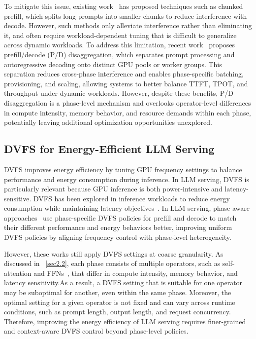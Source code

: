 To mitigate this issue, existing work~\cite{XX} has proposed techniques such as chunked prefill, which splits long prompts into smaller chunks to reduce interference with decode. However, such methods only alleviate interference rather than eliminating it, and often require workload-dependent tuning that is difficult to generalize across dynamic workloads. To address this limitation, recent work~\cite{XX} proposes prefill/decode (P/D) disaggregation, which separates prompt processing and autoregressive decoding onto distinct GPU pools or worker groups. This separation reduces cross-phase interference and enables phase-specific batching, provisioning, and scaling, allowing systems to better balance TTFT, TPOT, and throughput under dynamic workloads. However, despite these benefits, P/D disaggregation is a phase-level mechanism and overlooks operator-level differences in compute intensity, memory behavior, and resource demands within each phase, potentially leaving additional optimization opportunities unexplored.

\subsection{DVFS for Energy-Efficient LLM Serving}
DVFS improves energy efficiency by tuning GPU frequency settings to balance performance and energy consumption during inference. In LLM serving, DVFS is particularly relevant because GPU inference is both power-intensive and latency-sensitive. DVFS has been explored in inference workloads to reduce energy consumption while maintaining latency objectives~\cite{XX,XX}. In LLM serving, phase-aware approaches~\cite{XX,XX} use phase-specific DVFS policies for prefill and decode to match their different performance and energy behaviors better, improving uniform DVFS policies by aligning frequency control with phase-level heterogeneity.

However, these works still apply DVFS settings at coarse granularity. As discussed in ~\ref{sec2.2}, each phase consists of multiple operators, such as self-attention and FFNs~\cite{XX}, that differ in compute intensity, memory behavior, and latency sensitivity.As a result, a DVFS setting that is suitable for one operator may be suboptimal for another, even within the same phase. Moreover, the optimal setting for a given operator is not fixed and can vary across runtime conditions, such as prompt length, output length, and request concurrency. Therefore, improving the energy efficiency of LLM serving requires finer-grained and context-aware DVFS control beyond phase-level policies.
